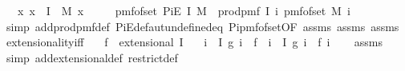 \begin{isabellebody}
\ \ \ {\isachardoublequoteopen}{\isasymAnd}x{\isachardot}{\kern0pt}\ x\ {\isasymin}\ I\ {\isasymLongrightarrow}\ M\ x\ {\isasymnoteq}\ {\isacharbraceleft}{\kern0pt}{\isacharbraceright}{\kern0pt}{\isachardoublequoteclose}\isanewline
\ \ \ {\isachardoublequoteopen}pmf{\isacharunderscore}{\kern0pt}of{\isacharunderscore}{\kern0pt}set\ {\isacharparenleft}{\kern0pt}PiE\ I\ M{\isacharparenright}{\kern0pt}\ {\isacharequal}{\kern0pt}\ prod{\isacharunderscore}{\kern0pt}pmf\ I\ {\isacharparenleft}{\kern0pt}{\isasymlambda}i{\isachardot}{\kern0pt}\ pmf{\isacharunderscore}{\kern0pt}of{\isacharunderscore}{\kern0pt}set\ {\isacharparenleft}{\kern0pt}M\ i{\isacharparenright}{\kern0pt}{\isacharparenright}{\kern0pt}{\isachardoublequoteclose}\isanewline
%
\isadelimproof
\ \ %
\endisadelimproof
%
\isatagproof
{}\isamarkupfalse%
\ {\isacharparenleft}{\kern0pt}simp\ add{\isacharcolon}{\kern0pt}prod{\isacharunderscore}{\kern0pt}pmf{\isacharunderscore}{\kern0pt}def\ PiE{\isacharunderscore}{\kern0pt}defaut{\isacharunderscore}{\kern0pt}undefined{\isacharunderscore}{\kern0pt}eq\ Pi{\isacharunderscore}{\kern0pt}pmf{\isacharunderscore}{\kern0pt}of{\isacharunderscore}{\kern0pt}set{\isacharbrackleft}{\kern0pt}OF\ assms{\isacharparenleft}{\kern0pt}{}{\isacharparenright}{\kern0pt}\ assms{\isacharparenleft}{\kern0pt}{}{\isacharparenright}{\kern0pt}\ assms{\isacharparenleft}{\kern0pt}{}{\isacharparenright}{\kern0pt}{\isacharbrackright}{\kern0pt}{\isacharparenright}{\kern0pt}%
\endisatagproof
{\isafoldproof}%
%
\isadelimproof
\isanewline
%
\endisadelimproof
\isanewline
\isanewline
{}\isamarkupfalse%
\ extensionality{\isacharunderscore}{\kern0pt}iff{\isacharcolon}{\kern0pt}\isanewline
\ \ \ {\isachardoublequoteopen}f\ {\isasymin}\ extensional\ I{\isachardoublequoteclose}\isanewline
\ \ \ {\isachardoublequoteopen}{\isacharparenleft}{\kern0pt}{\isacharparenleft}{\kern0pt}{\isasymlambda}i\ {\isasymin}\ I{\isachardot}{\kern0pt}\ g\ i{\isacharparenright}{\kern0pt}\ {\isacharequal}{\kern0pt}\ f{\isacharparenright}{\kern0pt}\ {\isacharequal}{\kern0pt}\ {\isacharparenleft}{\kern0pt}{\isasymforall}i\ {\isasymin}\ I{\isachardot}{\kern0pt}\ g\ i\ {\isacharequal}{\kern0pt}\ f\ i{\isacharparenright}{\kern0pt}{\isachardoublequoteclose}\isanewline
%
\isadelimproof
\ \ %
\endisadelimproof
%
\isatagproof
{}\isamarkupfalse%
\ assms\ \isamarkupfalse%
\ {\isacharparenleft}{\kern0pt}simp\ add{\isacharcolon}{\kern0pt}extensional{\isacharunderscore}{\kern0pt}def\ restrict{\isacharunderscore}{\kern0pt}def{\isacharparenright}{\kern0pt}\ \isamarkupfalse%

\end{isabellebody}
